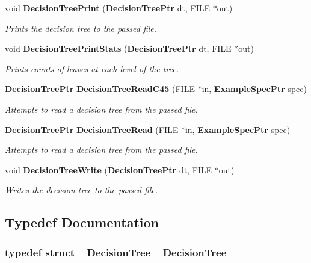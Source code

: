 \begin{CompactItemize}
void {\bf Decision\-Tree\-Print} ({\bf Decision\-Tree\-Ptr} dt, FILE $\ast$out)
\begin{CompactList}\small\item\em Prints the decision tree to the passed file. \item\end{CompactList}\item 
void {\bf Decision\-Tree\-Print\-Stats} ({\bf Decision\-Tree\-Ptr} dt, FILE $\ast$out)
\begin{CompactList}\small\item\em Prints counts of leaves at each level of the tree. \item\end{CompactList}\item 
{\bf Decision\-Tree\-Ptr} {\bf Decision\-Tree\-Read\-C45} (FILE $\ast$in, {\bf Example\-Spec\-Ptr} spec)
\begin{CompactList}\small\item\em Attempts to read a decision tree from the passed file. \item\end{CompactList}\item 
{\bf Decision\-Tree\-Ptr} {\bf Decision\-Tree\-Read} (FILE $\ast$in, {\bf Example\-Spec\-Ptr} spec)
\begin{CompactList}\small\item\em Attempts to read a decision tree from the passed file. \item\end{CompactList}\item 
void {\bf Decision\-Tree\-Write} ({\bf Decision\-Tree\-Ptr} dt, FILE $\ast$out)
\begin{CompactList}\small\item\em Writes the decision tree to the passed file. \item\end{CompactList}\end{CompactItemize}


\subsection{Typedef Documentation}
\subsubsection{\setlength{\rightskip}{0pt plus 5cm}typedef struct {\bf \_\-Decision\-Tree\_\-}  {\bf Decision\-Tree}}\label{DecisionTree_8h_a0}


